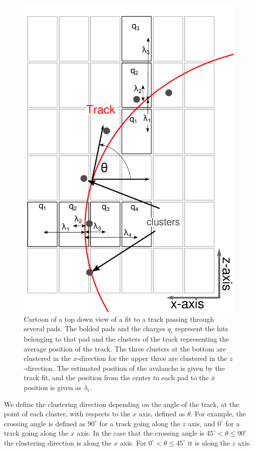 \documentclass[review]{elsarticle}
\begin{document}
\begin{figure}[ht!]
\includegraphics[scale=.5]{top_view_helix_ext.pdf}
\caption{Cartoon of a top down view of a fit to a track passing through several pads. The bolded pads and the charges $q_i$ represent the hits belonging to that pad and the clusters of the track representing the average position of the track. The three clusters at the bottom are clustered in the $x$-direction for the upper three are clustered in the $z$-direction. The estimated position of the avalanche is given by the track fit, and the position from the center to each pad to the $\bar{x}$ position is given as $\lambda_i$.}
\label{fig:topview}
\end{figure}

We define the clustering direction depending on the angle of the track, at the point of each cluster, with respects to the $x$ axis, defined as $\theta$. For example, the crossing angle is defined as $90^{\circ}$ for a track going along the $z$ axis, and $0^{\circ}$ for a track going along the $x$ axis. In the case that the crossing angle is $45^{\circ} < \theta \leq 90^{\circ} $ the clustering direction is along the $x$ axis. For $0^{\circ} < \theta \leq 45^{\circ}$ it is along the $z$ axis. 
\end{document}
